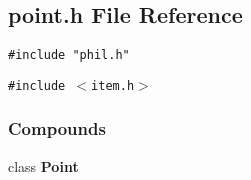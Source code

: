 \subsection{point.h File Reference}
\label{point.h}
{\tt \#include "phil.h"}\par
{\tt \#include $<$item.h$>$}\par
\subsubsection*{Compounds}
\begin{CompactItemize}
\item 
class {\bf Point}
\end{CompactItemize}
